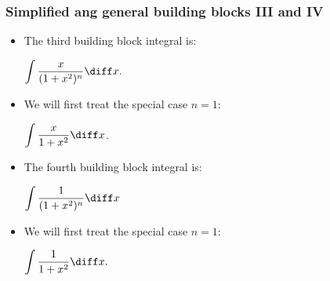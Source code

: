 \begin{frame}
\frametitle{Simplified ang general building blocks III and IV}
\begin{itemize}
\item The third building block integral is: 

$\displaystyle \int \frac{x}{(1+x^2)^n }\diff x.$

\item<2-> We will first treat the special case $n=1$:

$\displaystyle \int \frac{x}{1+x^2 }\diff x$. 
\item<3-> The fourth building block integral is:

$\displaystyle \int \frac{1}{(1+x^2)^n }\diff x$
\item<4->  We will first treat the special case $n=1$:

$\displaystyle \int \frac{1}{1+x^2 }\diff x.$
\end{itemize}

\end{frame}
